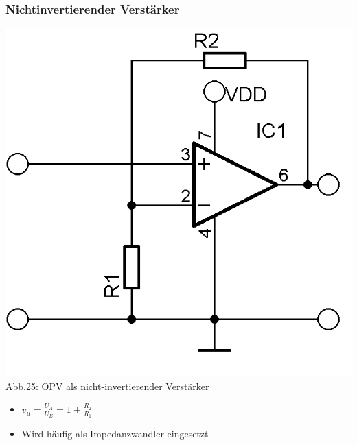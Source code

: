 \begin{frame}
\frametitle{Nichtinvertierender Verstärker}
	\begin{center}
	\includegraphics[scale=1]{a06/OPV-nonInverter.png}\\
	Abb.25: OPV als nicht-invertierender Verstärker
	\end{center}
	\begin{itemize}
		\item	$v_u = \frac{U_A}{U_E} = 1+\frac{R_2}{R_1}$
		\hspace{3mm}
		\item	Wird häufig als Impedanzwandler eingesetzt
	\end{itemize}
\end{frame}

